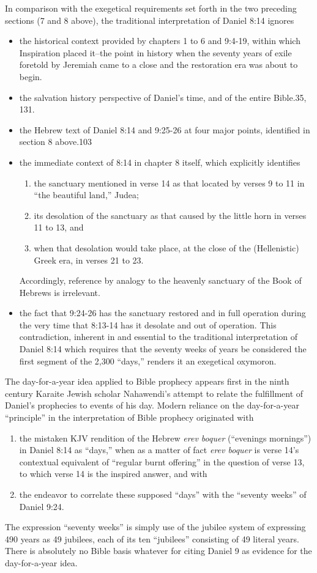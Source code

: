 In comparison with the exegetical requirements set forth in the two
preceding sections (7 and 8 above), the traditional interpretation of Daniel
8:14 ignores
\begin{itemize}
	\item the historical context provided by chapters 1 to 6 and 9:4-19, within
which Inspiration placed it--the point in history when the seventy years of
exile foretold by Jeremiah came to a close and the restoration era was
about to begin.
	\item the salvation history perspective of Daniel's time, and of the entire
Bible.35, 131.
	\item the Hebrew text of Daniel 8:14 and 9:25-26 at four major points,
identified in section 8 above.103
	\item the immediate context of 8:14 in chapter 8 itself, which explicitly
identifies
	\begin{enumerate}
		\item the sanctuary mentioned in verse 14 as that located by verses
9 to 11 in ``the beautiful land,'' Judea; 
		\item its desolation of the sanctuary
as that caused by the little horn in verses 11 to 13, and 
		\item when that
desolation would take place, at the close of the (Hellenistic) Greek era, in
verses 21 to 23.
	\end{enumerate}
	Accordingly, reference by analogy to the heavenly sanctuary
	of the Book of Hebrews is irrelevant.

	\item the fact that 9:24-26 has the sanctuary restored and in full operation
during the very time that 8:13-14 has it desolate and out of operation. This
contradiction, inherent in and essential to the traditional interpretation
of Daniel 8:14 which requires that the seventy weeks of years be considered
the first segment of the 2,300 ``days,'' renders it an exegetical oxymoron.
\end{itemize}

The day-for-a-year idea applied to Bible prophecy appears first in the ninth
century Karaite Jewish scholar Nahawendi's attempt to relate the fulfillment
of Daniel's prophecies to events of his day. Modern reliance on the
day-for-a-year ``principle'' in the interpretation of Bible prophecy
originated with
\begin{enumerate}
	\item the mistaken KJV rendition of the Hebrew \textit{erev boquer}
(``evenings mornings'') in Daniel 8:14 as ``days,'' when as a matter of fact 
\textit{erev boquer} is verse 14's contextual equivalent of ``regular burnt offering''
in the question of verse 13, to which verse 14 is the inspired answer, and
with 
	\item the endeavor to correlate these supposed ``days'' with the ``seventy
weeks'' of Daniel 9:24.
\end{enumerate}
The expression ``seventy weeks'' is simply use of the
jubilee system of expressing 490 years as 49 jubilees, each of its ten
``jubilees'' consisting of 49 literal years. There is absolutely no Bible
basis whatever for citing Daniel 9 as evidence for the day-for-a-year idea.

